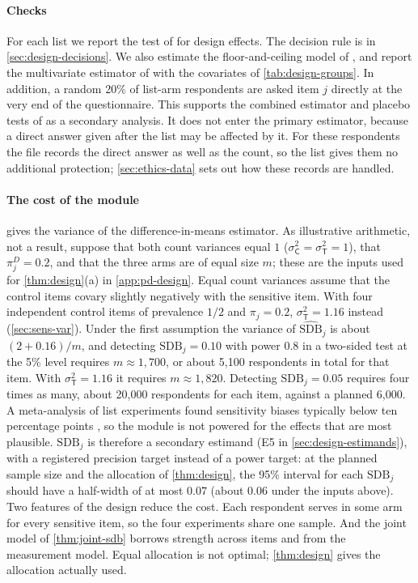 \paragraph{Checks}
For each list we report the test of \citet{blair2012} for design effects. The decision rule is in \cref{sec:design-decisions}. We also estimate the floor-and-ceiling model of \citet{blair2012}, and report the multivariate estimator of \citet{imai2011} with the covariates of \cref{tab:design-groups}. In addition, a random 20\% of list-arm respondents are asked item $j$ directly at the very end of the questionnaire. This supports the combined estimator and placebo tests of \citet{aronow2015} as a secondary analysis. It does not enter the primary estimator, because a direct answer given after the list may be affected by it. For these respondents the file records the direct answer as well as the count, so the list gives them no additional protection; \cref{sec:ethics-data} sets out how these records are handled.

\paragraph{The cost of the module}
 gives the variance of the difference-in-means estimator. As illustrative arithmetic, not a result, suppose that both count variances equal $1$ ($\sigma_{\mathsf{C}}^2=\sigma_{\mathsf{T}}^2=1$), that $\pi^D_j=0.2$, and that the three arms are of equal size $m$; these are the inputs used for \cref{thm:design}(a) in \cref{app:pd-design}. Equal count variances assume that the control items covary slightly negatively with the sensitive item. With four independent control items of prevalence $1/2$ and $\pi_j=0.2$, $\sigma_{\mathsf{T}}^2=1.16$ instead (\cref{sec:sens-var}). Under the first assumption the variance of $\widehat{\mathrm{SDB}}_j$ is about $(2+0.16)/m$, and detecting $\mathrm{SDB}_j=0.10$ with power 0.8 in a two-sided test at the 5\% level requires $m\approx 1{,}700$, or about 5,100 respondents in total for that item. With $\sigma_{\mathsf{T}}^2=1.16$ it requires $m\approx1{,}820$. Detecting $\mathrm{SDB}_j=0.05$ requires four times as many, about 20{,}000 respondents for each item, against a planned 6{,}000. A meta-analysis of list experiments found sensitivity biases typically below ten percentage points \citep{blair2020}, so the module is not powered for the effects that are most plausible. $\mathrm{SDB}_j$ is therefore a secondary estimand (E5 in \cref{sec:design-estimands}), with a registered precision target instead of a power target: at the planned sample size and the allocation of \cref{thm:design}, the 95\% interval for each $\mathrm{SDB}_j$ should have a half-width of at most $0.07$ (about $0.06$ under the inputs above). Two features of the design reduce the cost. Each respondent serves in some arm for every sensitive item, so the four experiments share one sample. And the joint model of \cref{thm:joint-sdb} borrows strength across items and from the measurement model. Equal allocation is not optimal; \cref{thm:design} gives the allocation actually used.

